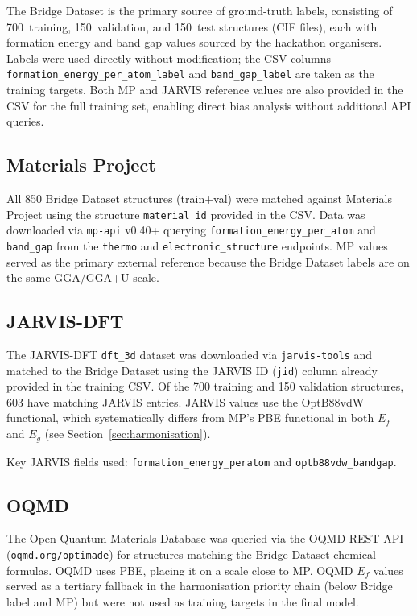 \documentclass[10pt, a4paper]{article}
\begin{document}
The Bridge Dataset is the primary source of ground-truth labels,
consisting of 700~training, 150~validation, and 150~test structures
(CIF files), each with formation energy and band gap values sourced
by the hackathon organisers.
Labels were used directly without modification; the CSV
columns \texttt{formation\_energy\_per\_atom\_label} and
\texttt{band\_gap\_label} are taken as the training targets.
Both MP and JARVIS reference values are also provided in the
CSV for the full training set, enabling direct bias analysis
without additional API queries.

\subsection{Materials Project}

All 850 Bridge Dataset structures (train+val) were matched against
Materials Project using the structure \texttt{material\_id} provided
in the CSV.
Data was downloaded via \texttt{mp-api} v0.40+ querying
\texttt{formation\_energy\_per\_atom} and
\texttt{band\_gap} from the \texttt{thermo} and
\texttt{electronic\_structure} endpoints.
MP values served as the primary external reference because the
Bridge Dataset labels are on the same GGA/GGA+U scale.

\subsection{JARVIS-DFT}

The JARVIS-DFT \texttt{dft\_3d} dataset was downloaded via
\texttt{jarvis-tools} and matched to the Bridge Dataset using
the JARVIS ID (\texttt{jid}) column already provided in the
training CSV.
Of the 700 training and 150 validation structures, 603 have
matching JARVIS entries.
JARVIS values use the OptB88vdW functional, which systematically
differs from MP's PBE functional in both $E_f$ and $E_g$
(see Section~\ref{sec:harmonisation}).

Key JARVIS fields used:
\texttt{formation\_energy\_peratom} and \texttt{optb88vdw\_bandgap}.

\subsection{OQMD}

The Open Quantum Materials Database was queried via the OQMD
REST API (\texttt{oqmd.org/optimade}) for structures matching
the Bridge Dataset chemical formulas.
OQMD uses PBE, placing it on a scale close to MP.
OQMD $E_f$ values served as a tertiary fallback in the
harmonisation priority chain (below Bridge label and MP)
but were not used as training targets in the final model.
\end{document}
